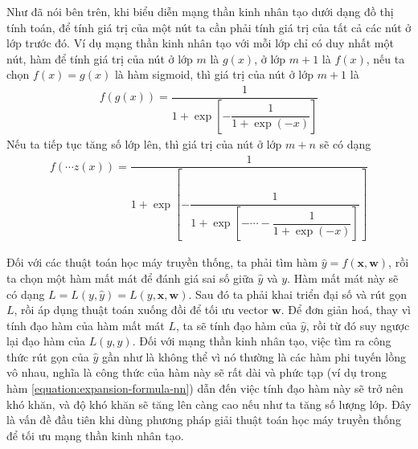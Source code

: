 Như đã nói bên trên, khi biểu diễn mạng thần kinh nhân tạo dưới dạng đồ thị tính toán, để tính giá trị của một nút ta cần phải tính giá trị của tất cả các nút ở lớp trước đó. Ví dụ mạng thần kinh nhân tạo với mỗi lớp chỉ có duy nhất một nút, hàm để tính giá trị của nút ở lớp $m$ là $g(x)$, ở lớp $m+1$ là $f(x)$, nếu ta chọn $f(x)=g(x)$ là hàm sigmoid, thì giá trị của nút ở lớp $m+1$ là
\begin{align}
    f(g(x))=\dfrac{1}{1+\exp\left[-\dfrac{1}{1+\exp(-x)}\right]}
\end{align}
Nếu ta tiếp tục tăng số lớp lên, thì giá trị của nút ở lớp $m+n$ sẽ có dạng
\begin{align}
    f(\cdots z(x))=\dfrac{1}{1+\exp\left[-\dfrac{1}{1+\exp\left[-\cdots-\dfrac{1}{1+\exp(-x)}\right]}\right]}
    \label{equation:expansion-formula-nn}
\end{align}

Đối với các thuật toán học máy truyền thống, ta phải tìm hàm $\hat{y}=f(\mathbf{x},\mathbf{w})$, rồi ta chọn một hàm mất mát để đánh giá sai số giữa $\hat{y}$ và $y$. Hàm mất mát này sẽ có dạng $L=L(y,\hat{y})=L(y,\mathbf{x},\mathbf{w})$. Sau đó ta phải khai triển đại số và rút gọn $L$, rồi áp dụng thuật toán xuống đồi để tối ưu vector $\mathbf{w}$. Để đơn giản hoá, thay vì tính đạo hàm của hàm mất mát $L$, ta sẽ tính đạo hàm của $\hat{y}$, rồi từ đó suy ngược lại đạo hàm của $L(y,\hat{y})$. Đối với mạng thần kinh nhân tạo, việc tìm ra công thức rút gọn của $\hat{y}$ gần như là không thể vì nó thường là các hàm phi tuyến lồng vô nhau, nghĩa là công thức của hàm này sẽ rất dài và phức tạp (ví dụ trong hàm \ref{equation:expansion-formula-nn}) dẫn đến việc tính đạo hàm này sẽ trở nên khó khăn, và độ khó khăn sẽ tăng lên càng cao nếu như ta tăng số lượng lớp. Đây là vấn đề đầu tiên khi dùng phương pháp giải thuật toán học máy truyền thống để tối ưu mạng thần kinh nhân tạo.

